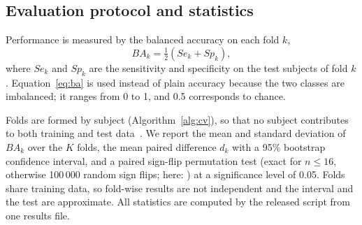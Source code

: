 \subsection{Evaluation protocol and statistics}
\label{sec:protocol}
Performance is measured by the balanced accuracy on each fold $k$,
\begin{equation}
  \mathit{BA}_k = \tfrac{1}{2}\left(\mathit{Se}_k + \mathit{Sp}_k\right),
  \label{eq:ba}
\end{equation}
where $\mathit{Se}_k$ and $\mathit{Sp}_k$ are the sensitivity and specificity on the test
subjects of fold $k$. Equation~\eqref{eq:ba} is used instead of plain accuracy because the
two classes are imbalanced; it ranges from 0 to 1, and 0.5 corresponds to chance.

Folds are formed by subject (Algorithm~\ref{alg:cv}), so that no subject contributes to both
training and test data~\cite{Saeb2017}. We report the mean and standard deviation of
$\mathit{BA}_k$ over the $K$ folds, the mean paired difference $d_k$ with a 95\% bootstrap
confidence interval, and a paired sign-flip permutation test (exact for $n \le 16$, otherwise
100\,000 random sign flips; here: ) at a significance level of 0.05. Folds
share training data, so fold-wise results are not independent and the interval and the test
are approximate. All statistics are computed by the released script from one results file.

